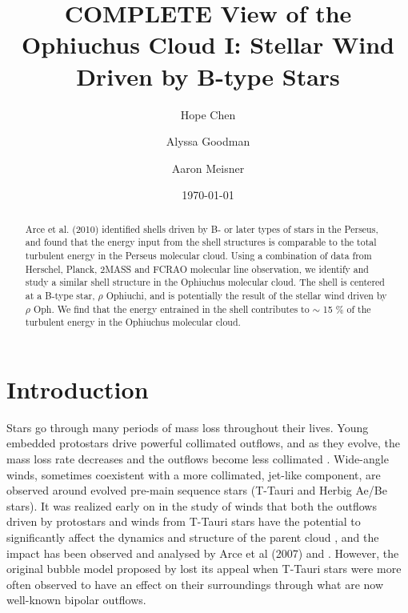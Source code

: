 \documentclass[11pt,a4paper]{emulateapj}
\begin{document}
\title{COMPLETE View of the Ophiuchus Cloud I: Stellar Wind Driven by B-type Stars}
\author{Hope Chen }
\author{Alyssa Goodman }
\author{Aaron Meisner }
\date{\today}


%
%

\begin{abstract}
Arce et al. (2010) identified shells driven by B- or later types of stars in the Perseus, and found that the energy input from the shell structures is comparable to the total turbulent energy in the Perseus molecular cloud. Using a combination of data from Herschel, Planck, 2MASS and FCRAO molecular line observation, we identify and study a similar shell structure in the Ophiuchus molecular cloud. The shell is centered at a B-type star, $\rho$ Ophiuchi, and is potentially the result of the stellar wind driven by $\rho$ Oph. We find that the energy entrained in the shell contributes to $\sim$ 15 \% of the turbulent energy in the Ophiuchus molecular cloud.
\end{abstract}

\section{Introduction} 
Stars go through many periods of mass loss throughout their lives. Young embedded protostars drive powerful collimated outflows, and as they evolve, the mass loss rate decreases and the outflows become less collimated \citep{Bontemps_1996,Arce_2006}. Wide-angle winds, sometimes coexistent with a more collimated, jet-like component, are observed around evolved pre-main sequence stars (T-Tauri and Herbig Ae/Be stars). It was realized early on in the study of winds that both the outflows driven by protostars and winds from T-Tauri stars have the potential to significantly affect the dynamics and structure of the parent cloud \citep{Norman_1980}, and the impact has been observed and analysed by Arce et al (2007) and \citet{Arce_2010}. However, the original bubble model proposed by \citet{Norman_1980} lost its appeal when T-Tauri stars were more often observed to have an effect on their surroundings through what are now well-known bipolar outflows.
\end{document}
